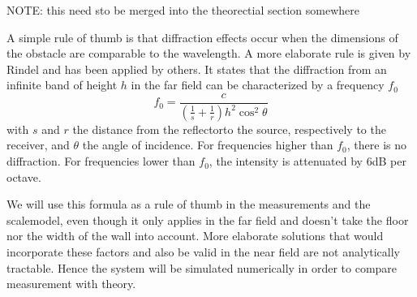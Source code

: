 NOTE: this need sto be merged into the theorectial section somewhere

A simple rule of thumb is that diffraction effects occur when the dimensions of the obstacle are comparable to the wavelength. A more elaborate rule is given by Rindel\cite{rindel-diffraction} and has been applied by others\cite{dave-diffraction, stage-acoustics}. It states that the diffraction from an infinite band of height $h$ in the far field can be characterized by a frequency $f_0$
$$
f_0 = \frac{c}{
	\left(\frac{1}{s} + \frac{1}{r}\right) h^2 \cos^2 \theta}
$$
with $s$ and $r$ the distance from the reflectorto the source, respectively to the receiver, and $\theta$ the angle of incidence. For frequencies higher than $f_0$, there is no diffraction. For frequencies lower than $f_0$, the intensity is attenuated by 6dB per octave. 

We will use this formula as a rule of thumb in the measurements and the scalemodel, even though it only applies in the far field and doesn't take the floor nor the width of the wall into account. More elaborate solutions that would incorporate these factors and also be valid in the near field are not analytically tractable. Hence the system will be simulated numerically in order to compare measurement with theory.
